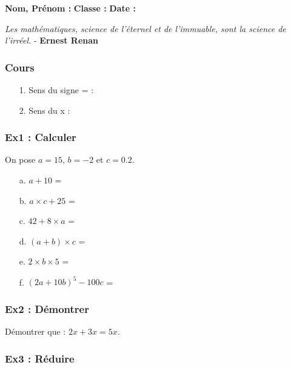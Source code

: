 



\textbf{Nom, Prénom :} \hspace{8cm} \textbf{Classe :} \hspace{3cm} \textbf{Date :}\\

\begin{center}
  \textit{Les mathématiques, science de l’éternel et de l’immuable, sont la science de l’irréel.}  - \textbf{Ernest Renan}
\end{center}

\subsubsection*{Cours}

\begin{enumerate}
	\item[1.] Sens du signe = : \dotfill 
	\item[2.] Sens du x :  \dotfill  
\end{enumerate}

\subsubsection*{Ex1 : Calculer}

On pose $a = 15$, $b = -2$ et $c = 0.2$.

\begin{enumerate}
  \item[a.] $a + 10$ = \dotfill 
  \item[b.] $a \times c + 25$ = \dotfill 
  \item[c.] $42 + 8 \times a$ = \dotfill 
  \item[d.] $(a + b)\times c$ = \dotfill 
  \item[e.] $2 \times b \times 5$ = \dotfill 
  \item[f.] $(2a + 10b)^5 - 100c$ = \dotfill 
\end{enumerate}


\subsubsection*{Ex2 : Démontrer}

Démontrer que : $2x + 3x = 5x$.
\Pointilles[2]

\subsubsection*{Ex3 : Réduire}

